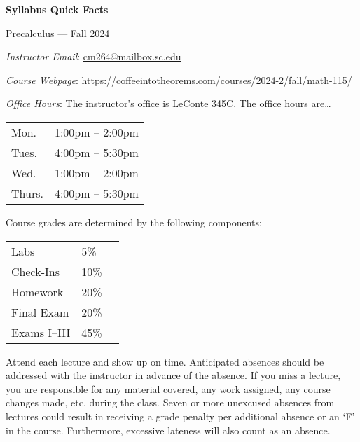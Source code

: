 \documentclass[11pt,letterpaper]{article}
\begin{document}
\begin{center} 
\bfseries
\color{scred}
\LARGE Syllabus Quick Facts \par\vspace{0.2\baselineskip}
\Large Precalculus --- Fall 2024
\end{center} \pspace


\hspace{0.53cm} {\itshape Instructor Email}: \href{mailto:cm264@mailbox.sc.edu}{cm264@mailbox.sc.edu} \par
\hspace{0.53cm} {\itshape Course Webpage}: \href{https://coffeeintotheorems.com/courses/2024-2/fall/math-115/}{https://coffeeintotheorems.com/courses/2024-2/fall/math-115/} \par
\hspace{0.53cm} {\itshape Office Hours}: The instructor's office is LeConte 345C. The office hours are\dots \par \vspace{-0.3cm}
	\begin{table}[!ht]
	\centering
	\begin{tabular}{l || l}
	Mon. & 1:00pm -- 2:00pm \\
	Tues. & 4:00pm -- 5:30pm \\
	Wed. & 1:00pm -- 2:00pm \\
	Thurs. & 4:00pm -- 5:30pm
	\end{tabular}
	\end{table}


Course grades are determined by the following components: \par \vspace{-0.3cm}
	\begin{table}[!ht]
        \begin{tabular}{llr}
        Labs & 5\% \\
	Check-Ins & 10\% \\
	Homework & 20\% \\
	Final Exam & 20\% \\
	Exams I--III & 45\% \\
        \end{tabular} 
        \end{table}


Attend each lecture and show up on time. Anticipated absences should be addressed with the instructor in advance of the absence. If you miss a lecture, you are responsible for any material covered, any work assigned, any course changes made, etc. during the class. Seven or more unexcused absences from lectures could result in receiving a grade penalty per additional absence or an `F' in the course. Furthermore, excessive lateness will also count as an absence. \pspace
\end{document}
